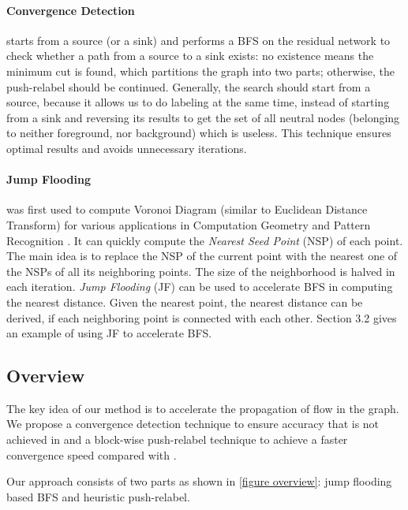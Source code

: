 \paragraph*{\textbf{Convergence Detection}}

starts from a source (or a sink) and performs a BFS on the residual network to check whether a path from a source to a sink exists:
no existence means the minimum cut is found, which partitions the graph into two parts; otherwise, the push-relabel should be continued.
Generally, the search should start from a source, because it allows us to do labeling at the same time, instead of starting from a sink and reversing its results to get the set of all neutral nodes (belonging to neither foreground, nor background) which is useless.
This technique ensures optimal results and avoids unnecessary iterations.

\paragraph*{\textbf{Jump Flooding}}

was first used to compute Voronoi Diagram (similar to Euclidean Distance Transform) for various applications in Computation Geometry and Pattern Recognition \cite{03MQR, 06RT}.
It can quickly compute the \textit{Nearest Seed Point} (NSP) of each point.
The main idea is to replace the NSP of the current point with the nearest one of the NSPs of all its neighboring points. The size of the neighborhood is halved in each iteration.
\textit{Jump Flooding} (JF) can be used to accelerate BFS in computing the nearest distance.
Given the nearest point, the nearest distance can be derived, if each neighboring point is connected with each other.
Section 3.2 gives an example of using JF to accelerate BFS.

\subsection{Overview}

The key idea of our method is to accelerate the propagation of flow in the graph. We propose a convergence detection technique to ensure accuracy that is not achieved in \cite{08VN} and a block-wise push-relabel technique to achieve a faster convergence speed compared with \cite{11W}.

Our approach consists of two parts as shown in \figurename \ref{figure overview}: jump flooding based BFS and heuristic push-relabel.

